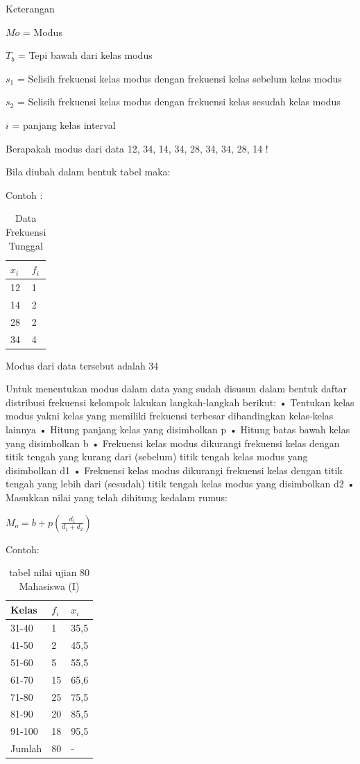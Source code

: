 \documentclass[11pt,fleqn]{book} %
\begin{document}
{Keterangan 

$Mo$ = Modus

$T_{b}$ = Tepi bawah dari kelas modus

$s_{1}$ = Selisih frekuensi kelas modus dengan frekuensi kelas sebelum kelas modus

$s_{2}$ = Selisih frekuensi kelas modus dengan frekuensi kelas sesudah kelas modus

$i$ = panjang kelas interval

Berapakah modus dari data 12, 34, 14, 34, 28, 34, 34, 28, 14 !

Bila diubah dalam bentuk tabel maka:

Contoh :

\begin{table}[h]
\centering
\begin{tabular}{l l}
\toprule
\textbf{$x_{i}$} & \textbf{$f_{i}$}\\
\midrule
12 & 1 \\
14 & 2 \\
28 & 2 \\
34 & 4 \\
\bottomrule
\end{tabular}
\caption{Data Frekuensi Tunggal}
\end{table}

Modus dari data tersebut adalah 34

Untuk menentukan modus dalam data yang sudah disusun dalam bentuk daftar distribusi frekuensi kelompok lakukan langkah-langkah berikut:
•	Tentukan kelas modus yakni kelas yang memiliki frekuensi terbesar dibandingkan kelas-kelas lainnya
•	Hitung panjang kelas yang disimbolkan p
•	Hitung batas bawah kelas yang disimbolkan b
•	Frekuensi kelas modus dikurangi frekuensi kelas dengan titik tengah yang kurang dari (sebelum) titik tengah kelas modus yang disimbolkan d1
•	Frekuensi kelas modus dikurangi frekuensi kelas dengan titik tengah yang lebih dari (sesudah) titik tengah kelas modus yang disimbolkan d2
•	Masukkan nilai yang telah dihitung kedalam rumus:

$M_{o} = b + p(\frac{d_{1}}{d_{1}+d_{2}})$

Contoh: 

\begin{table}[h]
\centering
\begin{tabular}{l l l}
\toprule
\textbf{Kelas} & \textbf{$f_{i}$} & \textbf{$x_{i}$}\\
\midrule
31-40 & 1 & 35,5\\
41-50 & 2 & 45,5\\
51-60 & 5 & 55,5\\
61-70 & 15 & 65,6\\
71-80 & 25 & 75,5\\
81-90 & 20 & 85,5\\
91-100 & 18 & 95,5\\
Jumlah & 80 & - \\
\bottomrule
\end{tabular}
\caption{tabel nilai ujian 80 Mahasiswa (I)}
\end{table}

}
\end{document}
